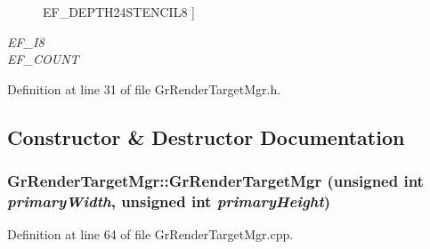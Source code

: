 \begin{CompactItemize}
\begin{Desc}
\begin{description}
{\hypertarget{class_gr_render_target_mgr_66d0ebb49e9781283d824f19f4bbc3f60610a6f54a0ca8c92a758f9779453d49}{
EF\_\-DEPTH24STENCIL8}
\label{class_gr_render_target_mgr_66d0ebb49e9781283d824f19f4bbc3f60610a6f54a0ca8c92a758f9779453d49}
}]\item[{\em 
\hypertarget{class_gr_render_target_mgr_66d0ebb49e9781283d824f19f4bbc3f67d4b0685ab48716d2321ec7258971218}{
EF\_\-I8}
\label{class_gr_render_target_mgr_66d0ebb49e9781283d824f19f4bbc3f67d4b0685ab48716d2321ec7258971218}
}]\item[{\em 
\hypertarget{class_gr_render_target_mgr_66d0ebb49e9781283d824f19f4bbc3f6c09969222a376e76623f4c8900470227}{
EF\_\-COUNT}
\label{class_gr_render_target_mgr_66d0ebb49e9781283d824f19f4bbc3f6c09969222a376e76623f4c8900470227}
}]\end{description}
\end{Desc}



Definition at line 31 of file GrRenderTargetMgr.h.

\subsection{Constructor \& Destructor Documentation}
\hypertarget{class_gr_render_target_mgr_5f555b4570db0e232b60580462db5344}{
\subsubsection[{GrRenderTargetMgr}]{\setlength{\rightskip}{0pt plus 5cm}GrRenderTargetMgr::GrRenderTargetMgr (unsigned int {\em primaryWidth}, \/  unsigned int {\em primaryHeight})}}
\label{class_gr_render_target_mgr_5f555b4570db0e232b60580462db5344}




Definition at line 64 of file GrRenderTargetMgr.cpp.\hypertarget{class_gr_render_target_mgr_850e21f4c7588233f838e1132cbff3cc}{
}
\end{CompactItemize}
